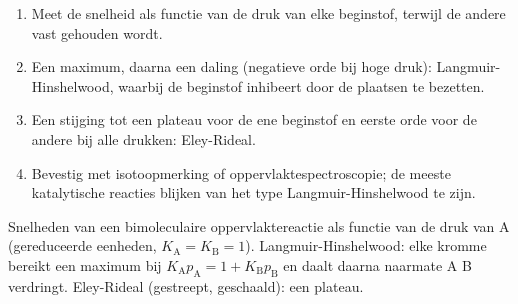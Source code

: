 \begin{method}\label{met:b3:surfaces-catalysis:mechanism-from-rate}
\begin{enumerate}
  \item Meet de snelheid als functie van de druk van elke beginstof, terwijl
        de andere vast gehouden wordt.
  \item Een maximum, daarna een daling (negatieve orde bij hoge druk):
        Langmuir-Hinshelwood, waarbij de beginstof inhibeert door de
        plaatsen te bezetten.
  \item Een stijging tot een plateau voor de ene beginstof en eerste orde
        voor de andere bij alle drukken: Eley-Rideal.
  \item Bevestig met isotoopmerking of oppervlaktespectroscopie; de meeste
        katalytische reacties blijken van het type Langmuir-Hinshelwood te
        zijn.
\end{enumerate}
\end{method}

\begin{omfigure}

{\small Snelheden van een bimoleculaire oppervlaktereactie als functie van
de druk van A (gereduceerde eenheden, $K_{\mathrm A} = K_{\mathrm B} = 1$).
Langmuir-Hinshelwood: elke kromme bereikt een maximum bij $K_{\mathrm A}p_{\mathrm A} =
1 + K_{\mathrm B}p_{\mathrm B}$ en daalt daarna naarmate A B verdringt.
Eley-Rideal (gestreept, geschaald): een plateau.}
\end{omfigure}

